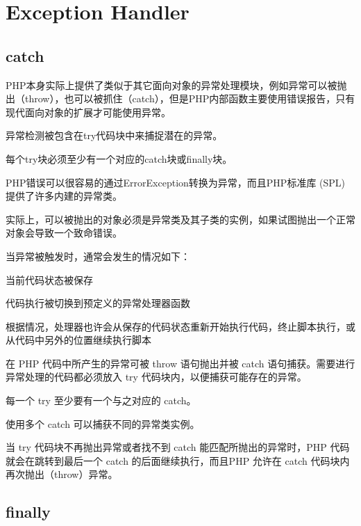 \section{Exception Handler}


\subsection{catch}



PHP本身实际上提供了类似于其它面向对象的异常处理模块，例如异常可以被抛出（throw），也可以被抓住（catch），但是PHP内部函数主要使用错误报告，只有现代面向对象的扩展才可能使用异常。

\begin{compactitem}
\item 异常检测被包含在try代码块中来捕捉潜在的异常。
\item 每个try块必须至少有一个对应的catch块或finally块。
\end{compactitem}

PHP错误可以很容易的通过ErrorException转换为异常，而且PHP标准库 (SPL) 提供了许多内建的异常类。

实际上，可以被抛出的对象必须是异常类及其子类的实例，如果试图抛出一个正常对象会导致一个致命错误。

当异常被触发时，通常会发生的情况如下：

\begin{compactitem}
\item 当前代码状态被保存
\item 代码执行被切换到预定义的异常处理器函数
\item 根据情况，处理器也许会从保存的代码状态重新开始执行代码，终止脚本执行，或从代码中另外的位置继续执行脚本
\end{compactitem}

在 PHP 代码中所产生的异常可被 throw 语句抛出并被 catch 语句捕获。需要进行异常处理的代码都必须放入 try 代码块内，以便捕获可能存在的异常。

\begin{compactitem}
\item 每一个 try 至少要有一个与之对应的 catch。
\item 使用多个 catch 可以捕获不同的异常类实例。
\end{compactitem}

当 try 代码块不再抛出异常或者找不到 catch 能匹配所抛出的异常时，PHP 代码就会在跳转到最后一个 catch 的后面继续执行，而且PHP 允许在 catch 代码块内再次抛出（throw）异常。

\subsection{finally}

